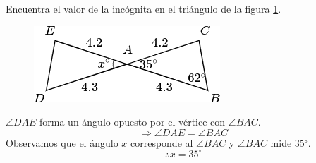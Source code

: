 Encuentra el valor de la incógnita en el triángulo de la figura \ref{fig:angle_triangle_12}.

\begin{minipage}[t][4cm][b]{0.3\textwidth}
    \begin{figure}[H]
        \centering
        \includegraphics[width=0.99\linewidth]{../images/angle_triangle_12.png}
        \caption{}
        \label{fig:angle_triangle_12}
    \end{figure}
\end{minipage}\hfill
\begin{minipage}[t]{0.65\textwidth}
    \begin{solutionbox}{4cm}
        $\angle DAE$ forma un ángulo opuesto por el vértice con $\angle BAC$.\\
        \[\Rightarrow \angle DAE = \angle BAC \]
        Observamos que el ángulo $x$ corresponde al
        $\angle BAC$ y $\angle BAC$ mide
        35$^\circ$.
        \[\therefore x=35^\circ\]
    \end{solutionbox}
\end{minipage}
